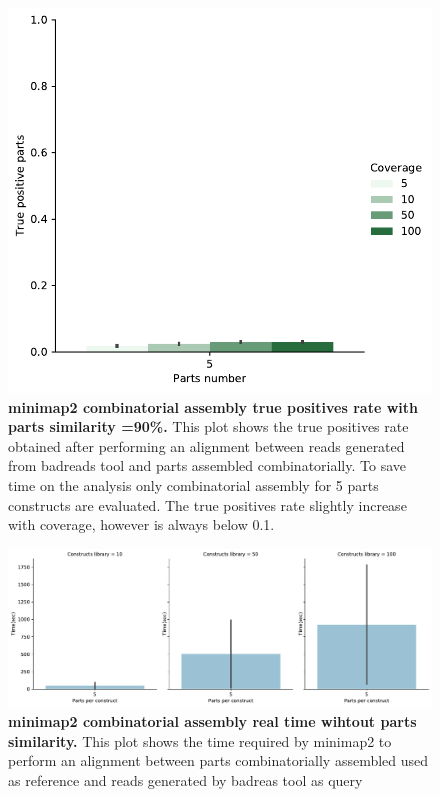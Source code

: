 \documentclass[11pt, a4paper]{article}
\begin{document}
  \begin{figure}[ht]
    \begin{center}
    \includegraphics[width=1\textwidth]{../results/images_notebook/v_400/combinatorial_sim_90_true_positive.pdf}
    \end{center}
    \caption{{\bf  minimap2 combinatorial assembly true positives rate with parts similarity =90\%.} This plot shows the true positives rate obtained after performing an alignment between reads generated from badreads tool and parts assembled combinatorially. To save time on the analysis only combinatorial assembly for 5 parts constructs are evaluated. The true positives rate slightly increase with coverage, however is always below 0.1.  }
   \label{fig:v_400_combinatorial_sim_90}
\end{figure}

  \begin{figure}[ht]
    \begin{center}
    \includegraphics[width=1.35\textwidth]{../results/images_notebook/v_400/combinatorial_sim_00_real_time.pdf}
    \end{center}
    \caption{{\bf  minimap2 combinatorial assembly real time wihtout parts similarity.} This plot shows the time required by minimap2 to perform an alignment between parts combinatorially assembled used as reference and reads generated by badreas tool as query}
   \label{fig:v_400_combinatorial_sim_00_real_time}
\end{figure}
\clearpage
\end{document}
